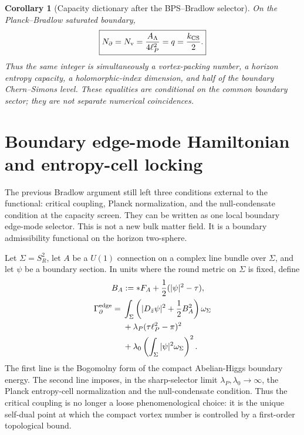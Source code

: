 \documentclass[aps,prd,reprint,nofootinbib,superscriptaddress,floatfix]{revtex4-2}
\numberwithin{equation}{section}
\theoremstyle{definition}
\theoremstyle{plain}
\newtheorem{corollary}{Corollary}[section]
\newcommand{\Ncap}{N_{\partial}}
\begin{document}
\begin{corollary}[Capacity dictionary after the BPS--Bradlow selector]
On the Planck--Bradlow saturated boundary,
\begin{equation}
\boxed{
\Ncap
=
N_{\rm v}
=
\frac{A_\Lambda}{4\ell_P^2}
=
q
=
\frac{k_{\rm CS}}2 .
}
\end{equation}
Thus the same integer is simultaneously a vortex-packing number, a horizon
entropy capacity, a holomorphic-index dimension, and half of the boundary
Chern--Simons level.  These equalities are conditional on the common boundary
sector; they are not separate numerical coincidences.
\end{corollary}




\section{Boundary edge-mode Hamiltonian and entropy-cell locking}
\label{sec:edge-mode-hamiltonian}

The previous Bradlow argument still left three conditions external to the
functional: critical coupling, Planck normalization, and the null-condensate
condition at the capacity screen.  They can be written as one local boundary
edge-mode selector.  This is not a new bulk matter field.  It is a boundary
admissibility functional on the horizon two-sphere.

Let \(\Sigma=S^2_R\), let \(A\) be a \(U(1)\) connection on a complex line
bundle over \(\Sigma\), and let \(\psi\) be a boundary section.  In units where
the round metric on \(\Sigma\) is fixed, define
\begin{equation}
\begin{aligned}
B_A&:=*F_A+\frac12(|\psi|^2-\tau),\\
\Gamma_{\partial}^{\rm edge}
={}&
\int_\Sigma
\left(|D_{\bar z}\psi|^2+\frac12 B_A^2\right)\omega_\Sigma\\
&+\lambda_P(\tau\ell_P^2-\pi)^2\\
&+\lambda_0
\left(\int_\Sigma|\psi|^2\omega_\Sigma\right)^2 .
\end{aligned}
\label{eq:edge-selector}
\end{equation}
The first line is the Bogomolny form of the compact Abelian-Higgs boundary
energy.  The second line imposes, in the sharp-selector limit
\(\lambda_P,\lambda_0\to\infty\), the Planck entropy-cell normalization and
the null-condensate condition.  Thus the critical coupling is no longer a
loose phenomenological choice: it is the unique self-dual point at which the
compact vortex number is controlled by a first-order topological bound.
\end{document}
